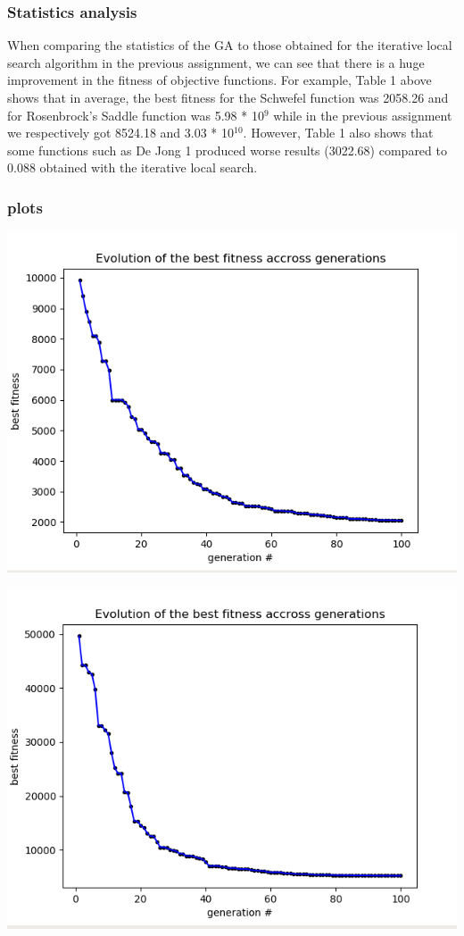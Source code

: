 \documentclass[12pt]{article}
\begin{document}
		\subsubsection{Statistics analysis}
		
			When comparing the statistics of the GA to those obtained for the iterative local search algorithm in the previous assignment, we can see that there is a huge improvement in the fitness of objective functions. For example, Table 1 above shows that in average, the best fitness for the Schwefel function was 2058.26 and for Rosenbrock's Saddle function was 5.98 * 10$^9$ while in the previous assignment we respectively got 8524.18 and 3.03 * 10$^{10}$. However, Table 1 also shows that some functions such as De Jong 1 produced worse results (3022.68) compared to 0.088 obtained with the iterative local search.
			\subsubsection{plots}
				\begin{minipage}{0.6\linewidth}
					\includegraphics[width=\linewidth]{1.png}
				\end{minipage}
				\hfill
				\begin{minipage}{0.6\linewidth}
					\includegraphics[width=\linewidth]{2.png}
				\end{minipage}
\end{document}
